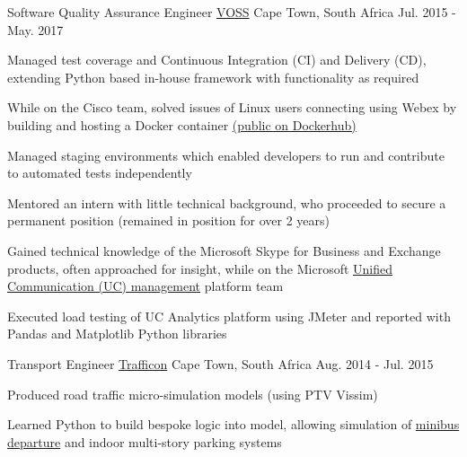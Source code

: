 \begin{cventries}
  \cventry
    {Software Quality Assurance Engineer} %
    {\href{https://www.voss-solutions.com}{VOSS}} %
    {Cape Town, South Africa} %
    {Jul. 2015 - May. 2017} %
    {
      \begin{cvitems} %
        \item {Managed test coverage and Continuous Integration (CI) and Delivery (CD), extending Python based in-house framework with functionality as required}
        \item {While on the Cisco team, solved issues of Linux users connecting using Webex by building and hosting a Docker container \href{https://hub.docker.com/r/dnk8n/docker-webex}{(public on Dockerhub)}}
        \item {Managed staging environments which enabled developers to run and contribute to automated tests independently}
        \item {Mentored an intern with little technical background, who proceeded to secure a permanent position (remained in position for over 2 years)}
        \item {Gained technical knowledge of the Microsoft Skype for Business and Exchange products, often approached for insight, while on the Microsoft \href{https://en.wikipedia.org/wiki/Unified_communications_management}{Unified Communication (UC) management} platform team}
        \item {Executed load testing of UC Analytics platform using JMeter and reported with Pandas and Matplotlib Python libraries}
      \end{cvitems}
    }

  \cventry
    {Transport Engineer} %
    {\href{http://trafficon.co.za}{Trafficon}} %
    {Cape Town, South Africa} %
    {Aug. 2014 - Jul. 2015} %
    {
      \begin{cvitems} %
        \item {Produced road traffic micro-simulation models (using PTV Vissim)}
        \item {Learned Python to build bespoke logic into model, allowing simulation of \href{https://www.youtube.com/watch?v=RjTvDzyl8WA}{minibus departure} and indoor multi-story parking systems}
      \end{cvitems}
    }

\end{cventries}
